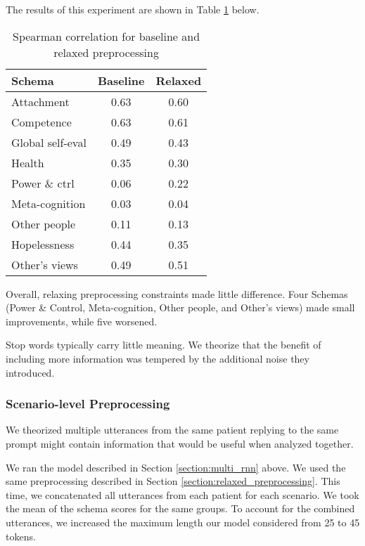 \documentclass[11pt,a4paper]{article}
\begin{document}
The results of this experiment are shown in Table \ref{tab:relaxed_preprocessing} below.

\begin{table}[H]
\centering
\begin{tabular}{lcc}
\toprule
Schema                  &Baseline          &Relaxed \\ %
\midrule
Attachment              & 0.63 & 0.60\\
Competence              & 0.63 & 0.61\\
Global self-eval        & 0.49 & 0.43\\
Health                  & 0.35 & 0.30\\
Power \& ctrl           & 0.06 & 0.22\\
Meta-cognition          & 0.03 & 0.04\\
Other people            & 0.11 & 0.13\\
Hopelessness            & 0.44 & 0.35\\
Other's views           & 0.49 & 0.51\\
\bottomrule
\end{tabular}
\caption{Spearman correlation for baseline and relaxed preprocessing}
\label{tab:relaxed_preprocessing}
\end{table}

Overall, relaxing preprocessing constraints made little difference. Four Schemas (Power \& Control, Meta-cognition, Other people, and Other's views) made small improvements, while five worsened. 

Stop words typically carry little meaning. We theorize that the benefit of including more information was tempered by the additional noise they introduced.

\subsubsection{Scenario-level Preprocessing}
We theorized multiple utterances from the same patient replying to the same prompt might contain information that would be useful when analyzed together.  

We ran the model described in Section \ref{section:multi_rnn} above. We used the same preprocessing described in Section \ref{section:relaxed_preprocessing}. This time, we concatenated all utterances from each patient for each scenario. We took the mean of the schema scores for the same groups. To account for the combined utterances, we increased the maximum length our model considered from 25 to 45 tokens. 
\end{document}
